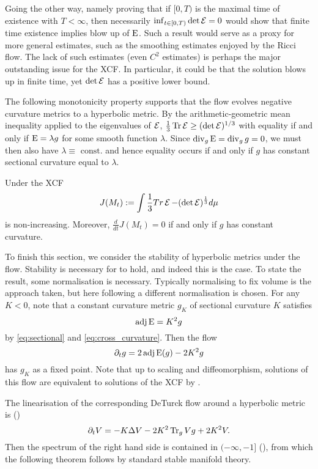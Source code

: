 \documentclass[a4paper,12pt]{amsart}
\begin{document}
Going the other way, namely proving that if \([0, T)\) is the maximal time of existence with \(T < \infty\), then necessarily \(\inf_{t \in [0, T)} \det \operatorname{\mathcal{E}} = 0\) would show that finite time existence implies blow up of \(\operatorname{E}\). Such a result would serve as a proxy for more general estimates, such as the smoothing estimates enjoyed by the Ricci flow. The lack of such estimates (even \(C^2\) estimates) is perhaps the major outstanding issue for the XCF. In particular, it could be that the solution blows up in finite time, yet \(\det \operatorname{\mathcal{E}}\) has a positive lower bound.

The following monotonicity property supports  that the flow evolves negative curvature metrics to a hyperbolic metric. By the arithmetic-geometric mean inequality applied to the eigenvalues of \(\operatorname{\mathcal{E}}\), \(\tfrac{1}{3} \operatorname{Tr}\operatorname{\mathcal{E}} \geq (\det \operatorname{\mathcal{E}})^{1/3}\) with equality if and only if \(\operatorname{E} = \lambda g\) for some smooth function \(\lambda\). Since \(\operatorname{div}_g \operatorname{E} = \operatorname{div}_g g = 0\), we must then also have \(\lambda \equiv \text{ const.}\) and hence equality occurs if and only if \(g\) has constant sectional curvature equal to \(\lambda\).

\begin{thm}[{\cite[Theorem 8]{MR2055396}}]
\label{thm:hyperbolicity}
Under the XCF
\[J(M_t):=\int \frac{1}{3} Tr \operatorname{\mathcal{E}} - (\det\operatorname{\mathcal{E}})^{\frac{1}{3}}d\mu\]
is non-increasing. Moreover, \(\frac{d}{dt}J(M_t) = 0\) if and only if $g$ has constant curvature.
\end{thm}

To finish this section, we consider the stability of hyperbolic metrics under the flow. Stability is necessary for  to hold, and indeed this is the case. To state the result, some normalisation is necessary. Typically normalising to fix volume is the approach taken, but here following \cite{MR2448593} a different normalisation is chosen. For any \(K < 0\), note that a constant curvature metric \(g_K\) of sectional curvature \(K\) satisfies
\[
\operatorname{adj}\operatorname{E} = K^2 g
\]
by \eqref{eq:sectional} and \eqref{eq:cross_curvature}. Then the flow
\[
\partial_t g = 2\operatorname{adj}\operatorname{E}(g) - 2K^2 g
\]
has \(g_K\) as a fixed point. Note that up to scaling and diffeomorphism, solutions of this flow are equivalent to solutions of the XCF by \cite[Lemma 1]{MR2448593}.

The linearisation of the corresponding DeTurck flow around a hyperbolic metric is (\cite[Lemma 2]{MR2448593})
\[
\partial_t V = -K \Delta V -2K^2 \operatorname{Tr}_g V g + 2K^2 V.
\]
Then the spectrum of the right hand side is contained in \((-\infty, -1]\) (\cite[Section 5]{MR2448593}), from which the following theorem follows by standard stable manifold theory.
\end{document}

